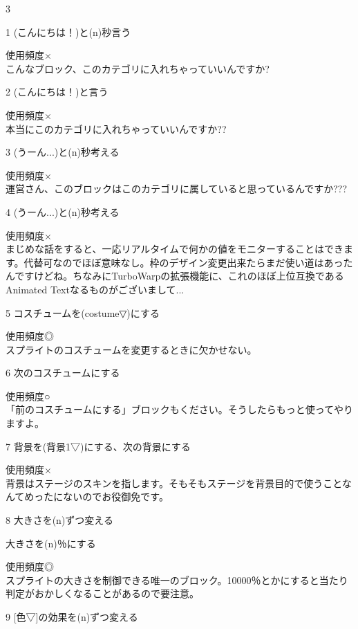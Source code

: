 \documentclass[b5paper,10pt]{jsarticle}
\begin{document}
\begin{multicols*}{3}
\begin{itembox}{1}
(こんにちは！)と(n)秒言う
\end{itembox}
使用頻度×\\
こんなブロック、このカテゴリに入れちゃっていいんですか?
\begin{itembox}{2}
(こんにちは！)と言う
\end{itembox}
使用頻度×\\
本当にこのカテゴリに入れちゃっていいんですか??
\begin{itembox}{3}
(うーん...)と(n)秒考える
\end{itembox}
使用頻度×\\
運営さん、このブロックはこのカテゴリに属していると思っているんですか???
\begin{itembox}{4}
(うーん...)と(n)秒考える
\end{itembox}
使用頻度×\\
まじめな話をすると、一応リアルタイムで何かの値をモニターすることはできます。代替可なのでほぼ意味なし。枠のデザイン変更出来たらまだ使い道はあったんですけどね。ちなみにTurboWarpの拡張機能に、これのほぼ上位互換であるAnimated Textなるものがございまして...
\begin{itembox}{5}
コスチュームを(costume▽)にする
\end{itembox}
使用頻度◎\\
スプライトのコスチュームを変更するときに欠かせない。
\begin{itembox}{6}
次のコスチュームにする
\end{itembox}
使用頻度○\\
「前のコスチュームにする」ブロックもください。そうしたらもっと使ってやりますよ。
\begin{itembox}{7}
背景を(背景1▽)にする、次の背景にする
\end{itembox}
使用頻度×\\
背景はステージのスキンを指します。そもそもステージを背景目的で使うことなんてめったにないのでお役御免です。
\begin{itembox}{8}
大きさを(n)ずつ変える

大きさを(n)％にする
\end{itembox}
使用頻度◎\\
スプライトの大きさを制御できる唯一のブロック。10000％とかにすると当たり判定がおかしくなることがあるので要注意。
\begin{itembox}{9}
[色▽]の効果を(n)ずつ変える


\end{itembox}
\end{multicols*}
\end{document}

